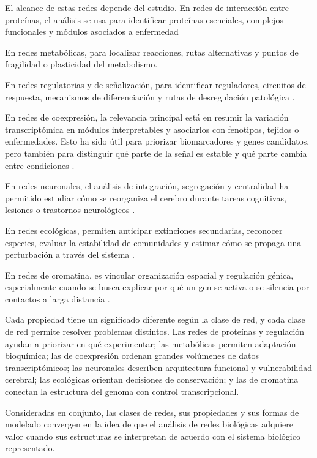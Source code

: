 \documentclass[11pt]{article}
\begin{document}
El alcance de estas redes depende del estudio. En redes de interacción entre proteínas, el análisis se usa para identificar proteínas esenciales, complejos funcionales y módulos asociados a enfermedad

En redes metabólicas, para localizar reacciones, rutas alternativas y puntos de fragilidad o plasticidad del metabolismo. 

En redes regulatorias y de señalización, para identificar reguladores, circuitos de respuesta, mecanismos de diferenciación y rutas de desregulación patológica \parencite{Jeong2001,EmmertStreib2014,BanfRhee2017}.

En redes de coexpresión, la relevancia principal está en resumir la variación transcriptómica en módulos interpretables y asociarlos con fenotipos, tejidos o enfermedades. Esto ha sido útil para priorizar biomarcadores y genes candidatos, pero también para distinguir qué parte de la señal es estable y qué parte cambia entre condiciones \parencite{ZhangHorvath2005,Zheng2021,Gnanakkumaar2019}.

En redes neuronales, el análisis de integración, segregación y centralidad ha permitido estudiar cómo se reorganiza el cerebro durante tareas cognitivas, lesiones o trastornos neurológicos \parencite{BullmoreSporns2009}. 

En redes ecológicas, permiten anticipar extinciones secundarias, reconocer especies, evaluar la estabilidad de comunidades y estimar cómo se propaga una perturbación a través del sistema \parencite{Memmott2004,Dunne2002,Bascompte2009}. 

En redes de cromatina, es vincular organización espacial y regulación génica, especialmente cuando se busca explicar por qué un gen se activa o se silencia por contactos a larga distancia \parencite{Beagrie2017}.

Cada propiedad tiene un significado diferente según la clase de red, y cada clase de red permite resolver problemas distintos. Las redes de proteínas y regulación ayudan a priorizar en qué experimentar; las metabólicas permiten adaptación bioquímica; las de coexpresión ordenan grandes volúmenes de datos transcriptómicos; las neuronales describen arquitectura funcional y vulnerabilidad cerebral; las ecológicas orientan decisiones de conservación; y las de cromatina conectan la estructura del genoma con control transcripcional. 



Consideradas en conjunto, las clases de redes, sus propiedades y sus formas de modelado convergen en la idea de que el análisis de redes biológicas adquiere valor cuando sus estructuras se interpretan de acuerdo con el sistema biológico representado.
\end{document}
